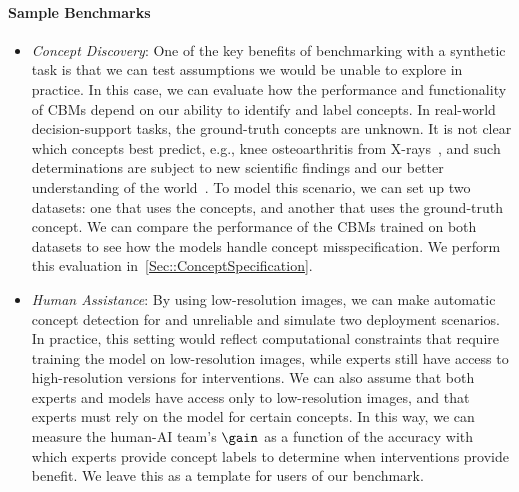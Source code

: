 \documentclass[11pt]{article}
\begin{document}
\paragraph{Sample Benchmarks}
\begin{itemize}[leftmargin=0pt,label={}]

    \item \emph{Concept Discovery}: One of the key benefits of benchmarking with a synthetic task is that we can test assumptions we would be unable to explore in practice. In this case, we can evaluate how the performance and functionality of CBMs depend on our ability to identify and label concepts. In real-world decision-support tasks, the ground-truth concepts are unknown. It is not clear which concepts best predict, e.g., knee osteoarthritis from X-rays~\citep{koh2020concept}, and such determinations are subject to new scientific findings and our better understanding of the world~\citep[e.g., see the paradigm changes in][]{ahmed200523}. To model this scenario, we can set up two datasets: one that uses the  concepts, and another that uses the ground-truth  concept. We can compare the performance of the CBMs trained on both datasets to see how the models handle concept misspecification. We perform this evaluation in~\cref{Sec::ConceptSpecification}.
    
    \item \emph{Human Assistance}: By using low-resolution images, we can make automatic concept detection for  and  unreliable and simulate two deployment scenarios. In practice, this setting would reflect computational constraints that require training the model on low-resolution images, while experts still have access to high-resolution versions for interventions. We can also assume that both experts and models have access only to low-resolution images, and that experts must rely on the model for certain concepts. In this way, we can measure the human-AI team's $\gain$ as a function of the accuracy with which experts provide concept labels to determine when interventions provide benefit. We leave this as a template for users of our benchmark.


\end{itemize}
\end{document}
